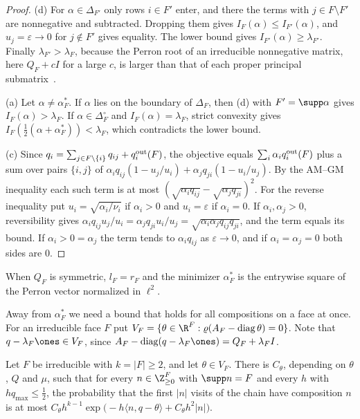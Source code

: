 \begin{proof}
(d) For $\alpha\in\Delta_{F'}$ only rows $i\in F'$ enter, and there the terms
with $j\in F\setminus F'$ are nonnegative and subtracted. Dropping them gives
$I_F(\alpha)\le I_{F'}(\alpha)$, and $u_j=\varepsilon\to0$ for $j\notin F'$
gives equality. The lower bound gives $I_{F'}(\alpha)\ge\lambda_{F'}$. Finally
$\lambda_{F'}>\lambda_F$, because the Perron root of an irreducible nonnegative
matrix, here $Q_F+cI$ for a large $c$, is larger than that of each proper
principal submatrix~\cite[Ch.~2]{bermanplemmons1994}.

(a) Let $\alpha\ne\alpha^*_F$. If $\alpha$ lies on the boundary of $\Delta_F$,
then (d) with $F'=\supp\alpha$ gives $I_F(\alpha)>\lambda_F$. If
$\alpha\in\Delta_F^\circ$ and $I_F(\alpha)=\lambda_F$, strict convexity gives
$I_F(\frac12(\alpha+\alpha^*_F))<\lambda_F$, which contradicts the lower bound.

(c) Since $q_i=\sum_{j\in F\setminus\{i\}}q_{ij}+q_i^{\rm out}(F)$, the
objective equals $\sum_i\alpha_iq_i^{\rm out}(F)$ plus a sum over pairs
$\{i,j\}$ of
$\alpha_iq_{ij}(1-u_j/u_i)+\alpha_jq_{ji}(1-u_i/u_j)$. By the AM--GM
inequality each such term is at most
$(\sqrt{\alpha_iq_{ij}}-\sqrt{\alpha_jq_{ji}})^2$. For the reverse inequality
put $u_i=\sqrt{\alpha_i/\nu_i}$ if $\alpha_i>0$ and $u_i=\varepsilon$ if
$\alpha_i=0$. If $\alpha_i,\alpha_j>0$, reversibility gives
$\alpha_iq_{ij}u_j/u_i=\alpha_jq_{ji}u_i/u_j=\sqrt{\alpha_i\alpha_jq_{ij}q_{ji}}$,
and the term equals its bound.
If $\alpha_i>0=\alpha_j$ the term tends to $\alpha_iq_{ij}$ as
$\varepsilon\to0$, and if $\alpha_i=\alpha_j=0$ both sides are $0$.
\end{proof}

When $Q_F$ is symmetric, $l_F=r_F$ and the minimizer $\alpha^*_F$ is the
entrywise square of the Perron vector normalized in $\ell^2$.

Away from $\alpha^*_F$ we need a bound that holds for all compositions on a
face at once. For an irreducible face $F$ put
$V_F=\{\theta\in\R^F:\varrho(A_F-\operatorname{diag}\theta)=0\}$. Note that
$q-\lambda_F\ones\in V_F$, since
$A_F-\operatorname{diag}(q-\lambda_F\ones)=Q_F+\lambda_FI$.

\begin{lemma}\label{lem:upper}
Let $F$ be irreducible with $k=\lvert F\rvert\ge2$, and let $\theta\in V_F$.
There is $C_\theta$, depending on $\theta$, $Q$ and $\mu$, such that for every
$n\in\Z_{\ge0}^F$ with $\supp n=F$ and every $h$ with $hq_{\max}\le\frac12$,
the probability that the first $\lvert n\rvert$ visits of the chain have
composition $n$ is at most
$C_\theta h^{k-1}\exp\bigl(-h\langle n,q-\theta\rangle+C_\theta h^2\lvert
n\rvert\bigr)$.
\end{lemma}


